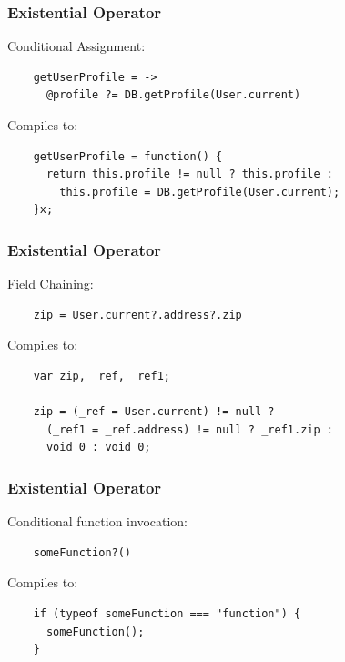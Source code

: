 \documentclass{beamer}
\begin{document}
%
%
 \begin{frame}[fragile]
  \frametitle{Existential Operator}


  Conditional Assignment:

  \begin{verbatim}
    getUserProfile = ->
      @profile ?= DB.getProfile(User.current)
  \end{verbatim}

  \pause
  \vspace{.5cm}
  Compiles to:
  \vspace{.5cm}

  \begin{verbatim}
    getUserProfile = function() {
      return this.profile != null ? this.profile : 
        this.profile = DB.getProfile(User.current);
    }x;
  \end{verbatim}  
\end{frame}

 \begin{frame}[fragile]
  \frametitle{Existential Operator}


  Field Chaining:

  \begin{verbatim}
    zip = User.current?.address?.zip
  \end{verbatim}

  \pause
  \vspace{.5cm}
  Compiles to:
  \vspace{.5cm}

  \begin{verbatim}
    var zip, _ref, _ref1;

    zip = (_ref = User.current) != null ? 
      (_ref1 = _ref.address) != null ? _ref1.zip : 
      void 0 : void 0;
  \end{verbatim}  
\end{frame}

 \begin{frame}[fragile]
  \frametitle{Existential Operator}

  Conditional function invocation:

  \begin{verbatim}
    someFunction?()
  \end{verbatim}

  \pause
  \vspace{.5cm}
  Compiles to:
  \vspace{.5cm}

  \begin{verbatim}
    if (typeof someFunction === "function") {
      someFunction();
    }
  \end{verbatim}  
\end{frame}
\end{document}
